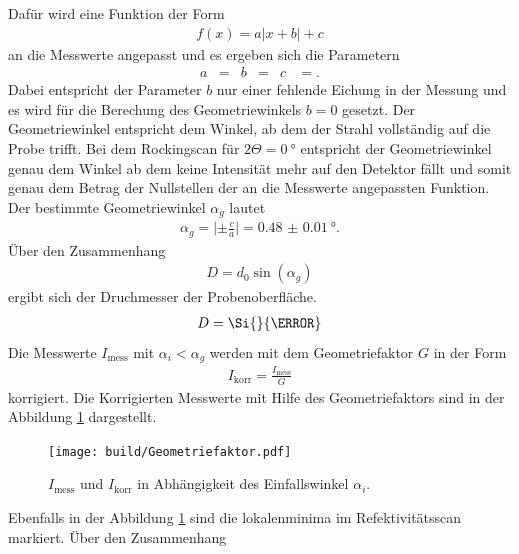 Dafür wird eine Funktion der Form
\begin{align}
  f(x) = a \lvert x + b \rvert + c
\end{align}
an die Messwerte angepasst und es ergeben sich die Parametern
\begin{align}
a&= &b&=  &c&=.
\end{align}
Dabei entspricht der Parameter $b$ nur einer fehlende Eichung in der Messung und
es wird für die Berechung des Geometriewinkels $b=0$ gesetzt.
Der Geometriewinkel entspricht dem Winkel, ab dem der Strahl
vollständig auf die Probe trifft. Bei dem Rockingscan für $2\Theta=\SI{0}{\degree}$
entspricht der Geometriewinkel genau dem Winkel ab dem keine Intensität
mehr auf den Detektor fällt und somit genau dem Betrag der Nullstellen der an die Messwerte
angepassten Funktion.
Der bestimmte Geometriewinkel $\alpha_g$
lautet
\begin{align}
\alpha_g = \lvert \pm\frac{c}{a} \rvert = \SI{0.48(1)}{\degree}.
\end{align}
Über den Zusammenhang
\begin{align}
D = d_0\sin(\alpha_g)
\end{align}
ergibt sich der Druchmesser
der Probenoberfläche.
\begin{align}
  D=\Si{}{\meter}
\end{align}
Die Messwerte $I_{\mathrm{mess}}$ mit $\alpha_i < \alpha_g $ werden mit dem Geometriefaktor $G$
in der Form
\begin{align}
  I_{\mathrm{korr}} = \frac{I_{\mathrm{mess}}}{G}
\end{align}
korrigiert. Die Korrigierten Messwerte mit Hilfe des Geometriefaktors sind in der Abbildung \ref{fig:korr} dargestellt.
\begin{figure}
  \centering
  \texttt{[image: build/Geometriefaktor.pdf]}
  \caption{$I_{\mathrm{mess}}$ und $I_{\mathrm{korr}}$ in Abhängigkeit des Einfallswinkel $\alpha_i$.}
  \label{fig:korr}
\end{figure}

Ebenfalls in der Abbildung \ref{fig:korr}
sind die lokalenminima im Refektivitätsscan markiert.
Über den Zusammenhang
\begin{align}
  
\end{align}





%
